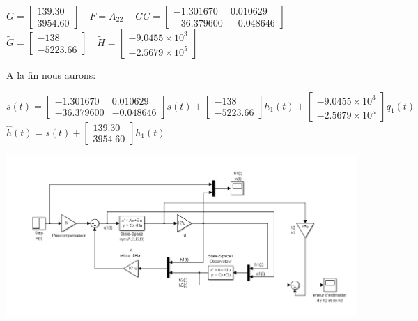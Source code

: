 		\begin{center}
		
			$G= \begin{bmatrix} 139.30\\3954.60 \end{bmatrix} \quad F=A_{22}-GC= \begin{bmatrix} -1.301670&0.010629\\-36.379600&-0.048646 \end{bmatrix}$	\\[0.25cm]
			$\tilde{G}= \begin{bmatrix} -138\\-5223.66 \end{bmatrix} \quad \tilde{H}= \begin{bmatrix} -9.0455 \times 10^{3} \\ -2.5679 \times 10^{5} \end{bmatrix}  $
		
		\end{center}
		
		A la fin nous aurons: 
		
		\begin{center}
	 $\dot s(t)= \begin{bmatrix} -1.301670&0.010629\\-36.379600&-0.048646 \end{bmatrix} s(t) + \begin{bmatrix} -138\\-5223.66 \end{bmatrix} h_1(t)+ \begin{bmatrix} -9.0455 \times 10^{3} \\ -2.5679 \times 10^{5} \end{bmatrix} q_1(t)$\\[0.25cm]
	 $\widehat{h}(t)=s(t)+ \begin{bmatrix} 139.30\\ 3954.60 \end{bmatrix} h_1(t)$\\[0.25cm]
	 \end{center}
	 
	    \begin{center}
		\includegraphics[scale=0.35]{observateurSIMU.PNG} 
		\label{fig4}
		\end{center}
		

